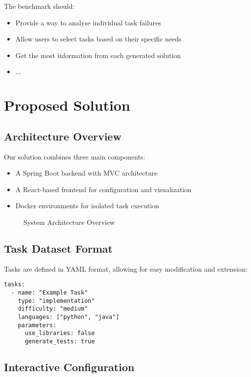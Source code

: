 The benchmark should:
\begin{itemize}
    \item Provide a way to analyse individual task failures
    \item Allow users to select tasks based on their specific needs
    \item Get the most information from each generated solution
    \item ...
\end{itemize}

\chapter{Proposed Solution}

\section{Architecture Overview}

Our solution combines three main components:
\begin{itemize}
    \item A Spring Boot backend with MVC architecture
    \item A React-based frontend for configuration and visualization
    \item Docker environments for isolated task execution
\end{itemize}

\begin{figure}[h]
    \centering
    \caption{System Architecture Overview}
    \label{fig:architecture}
\end{figure}

\section{Task Dataset Format}

Tasks are defined in YAML format, allowing for easy modification and extension:

\begin{verbatim}
tasks:
  - name: "Example Task"
    type: "implementation"
    difficulty: "medium"
    languages: ["python", "java"]
    parameters:
      use_libraries: false
      generate_tests: true
\end{verbatim}

\section{Interactive Configuration}

